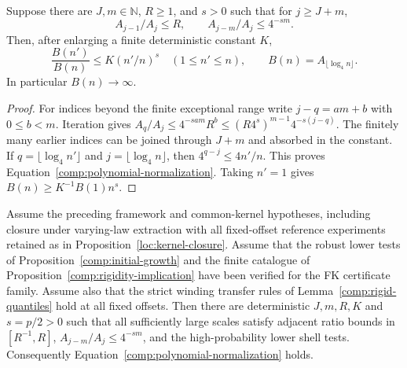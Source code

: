 \begin{lemma}
\label{comp:polynomial-algebra}
Suppose there are $J,m\in\mathbb N$, $R\ge1$, and $s>0$ such that
for $j\ge J+m$,
\[
 A_{j-1}/A_j\le R,\qquad A_{j-m}/A_j\le4^{-sm}.
\]
Then, after enlarging a finite deterministic constant $K$,
\begin{equation}\label{comp:polynomial-normalization}
 \frac{B(n')}{B(n)}\le K(n'/n)^s\quad(1\le n'\le n),
 \qquad B(n)=A_{\lfloor\log_4 n\rfloor}.
\end{equation}
In particular $B(n)\to\infty$.
\end{lemma}

\begin{proof}
For indices beyond the finite exceptional range write $j-q=am+b$ with
$0\le b<m$.  Iteration gives
$A_q/A_j\le4^{-sam}R^b\le(R4^s)^{m-1}4^{-s(j-q)}$.
The finitely many earlier indices can be joined through $J+m$ and
absorbed in the constant.  If $q=\lfloor\log_4 n'\rfloor$ and
$j=\lfloor\log_4 n\rfloor$, then
$4^{q-j}\le4n'/n$.  This proves Equation~\eqref{comp:polynomial-normalization}.
Taking $n'=1$ gives $B(n)\ge K^{-1}B(1)n^s$.
\end{proof}

\begin{proposition}
\label{comp:propagation}
Assume the preceding framework and common-kernel hypotheses, including
closure under varying-law extraction with all fixed-offset reference
experiments retained as in Proposition~\ref{loc:kernel-closure}.
Assume that the robust lower tests of
Proposition~\ref{comp:initial-growth} and the finite catalogue of
Proposition~\ref{comp:rigidity-implication} have been verified for the
FK certificate family.  Assume also that the strict winding transfer
rules of Lemma~\ref{comp:rigid-quantiles} hold at all fixed offsets.
Then there are deterministic $J,m,R,K$ and $s=p/2>0$ such that all
sufficiently large scales satisfy adjacent ratio bounds in $[R^{-1},R]$,
$A_{j-m}/A_j\le4^{-sm}$, and the high-probability lower shell tests.
Consequently Equation~\eqref{comp:polynomial-normalization} holds.
\end{proposition}

